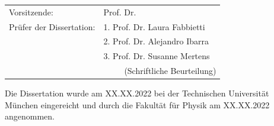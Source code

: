 {  	\begin{tabularx}{1.0\textwidth}{XX}
	Vorsitzende:	&	Prof. Dr.  \\
	Prüfer der Dissertation:	&	1. Prof. Dr. Laura Fabbietti \\
							&	2. Prof. Dr. Alejandro Ibarra \\
							&	3. Prof. Dr. Susanne Mertens\\
							& \ \ \ \ \  (Schriftliche Beurteilung) \\
	\end{tabularx}


	\vspace*{\fill}

	Die Dissertation wurde am XX.XX.2022 bei der Technischen Universität München
	eingereicht und durch die Fakultät für Physik am XX.XX.2022 angenommen.

  \vspace*{\fill}

  \null
  \vfill

}

